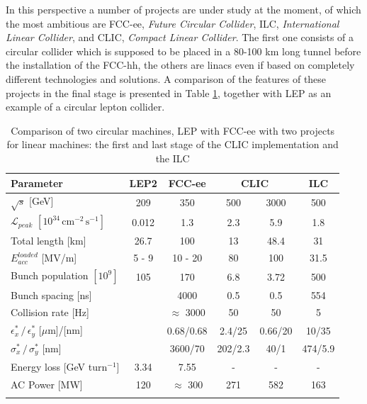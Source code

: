 In this perspective a number of projects are under study at the moment, of which the most ambitious are FCC-ee, \textit{Future Circular Collider}, ILC, \textit{International Linear Collider}, and CLIC, \textit{Compact Linear Collider}. The first one consists of a circular collider which is supposed to be placed in a 80-100 km long tunnel before the installation of the FCC-hh, the others are linacs even if based on completely different technologies and solutions.  A comparison of the features of these projects in the final stage is presented in Table \ref{table_CLIC_ILC_FCC}, together with LEP as an example of a circular lepton collider.

\begin{table}
  \centering
    \begin{tabular}{ l c c | c c c }
    \hline
    \hline
    \textbf{Parameter}								& \textbf{LEP2}	&	\textbf{FCC-ee}	&  \multicolumn{2}{c}{\textbf{CLIC}}	&	\textbf{ILC}	\\
    \hline
    $\sqrt{s}$ [GeV]								& 209	& 350  			&  	500	&  3000	& 500	\\
    $\mathscr{L}_{peak}$  $[10^{34} \, \text{cm}^{-2} \, \text{s}^{-1}]$	&0.012	& 1.3				&  	2.3	& 	5.9	&1.8		\\
    Total length [km]								&26.7	& 100			& 13		&  48.4	& 31		\\
    $E_{acc}^{loaded}$ [MV/m]						& 5 - 9	& 10 - 20			& 80		& 100 	& 31.5	\\
    Bunch population $[10^9]$						& 105	& 170  			&  6.8	& 	3.72	& 500	\\
    Bunch spacing [ns]							& 		& 4000	  		&  	0.5	& 	0.5	& 554	\\
    Collision rate [Hz]								&  		&$\approx$ 3000	&  	50	& 	50	& 5		\\
    $\epsilon^*_x \, / \, \epsilon^*_y $ [$\mu$m]/[nm]		& 		&  	0.68/0.68	        		&  2.4/25	& 0.66/20	& 10/35	\\  
    $\sigma^*_x\, / \, \sigma^*_y$ [nm]				& 		&  	3600/70		&  202/2.3	& 40/1	&474/5.9	\\    
    Energy loss [GeV turn$^{-1}$]					&  3.34	& 	7.55			& - 		& -		& -		\\
    AC Power [MW]								&  120	& $\approx$ 300		& 271	& 582	& 163	\\
    \hline
    \hline
    \label{CLIC_param_table}
    \end{tabular}
  \caption{Comparison of two circular machines, LEP\cite{Aull:2156972,LEP:RF} with FCC-ee\cite{FCC-ee:leptonCollParam,Zimmermann:2057706} with two projects for linear machines: the first and last stage of the CLIC implementation \cite{CLIC:cdr} and the ILC\cite{ILC:tdr} }\label{table_CLIC_ILC_FCC}
\end{table}



